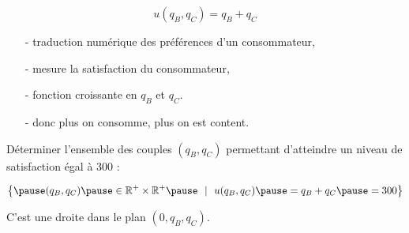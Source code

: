 \documentclass[9pt,professionalfonts,handout,hyperref]{beamer}
\begin{document}
%

\begin{frame}

$$u(q_B, q_C) = q_B + q_C$$

\bigskip

\begin{itemize}
\item[-] traduction numérique des préférences d'un consommateur, \newline

\item[-] mesure la satisfaction du consommateur, \newline

\item[-] fonction croissante en $q_B$ et $q_C$.\newline

\item[-] donc plus on consomme, plus on est content.

\end{itemize}
\end{frame}

\begin{frame}

Déterminer l'ensemble des couples $(q_B, q_C)$ permettant d'atteindre un niveau de satisfaction égal à 300 :

$$ \left\{\pause (q_B, q_C) \pause \in \mathbb{R}^{+}\times\mathbb{R}^{+} \pause ~~|~~u(q_B, q_C) \pause = q_B + q_C \pause =300 \right\} $$

\bigskip

\pause C'est une droite dans le plan $(0,q_B,q_C)$.

\end{frame}
\end{document}
